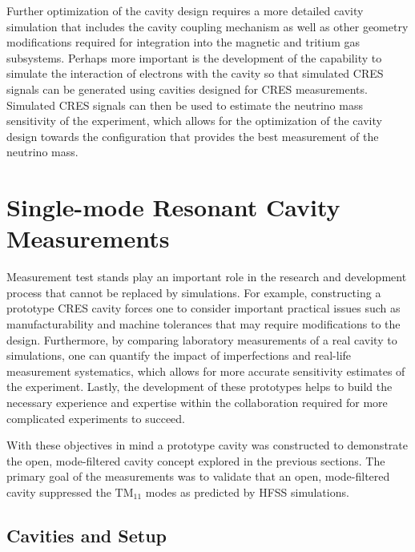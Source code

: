 Further optimization of the cavity design requires a more detailed cavity simulation that includes the cavity coupling mechanism as well as other geometry modifications required for integration into the magnetic and tritium gas subsystems. Perhaps more important is the development of the capability to simulate the interaction of electrons with the cavity so that simulated CRES signals can be generated using cavities designed for CRES measurements. Simulated CRES signals can then be used to estimate the neutrino mass sensitivity of the experiment, which allows for the optimization of the cavity design towards the configuration that provides the best measurement of the neutrino mass. 

\section{Single-mode Resonant Cavity Measurements}
\label{sec:chap6-single-mode-cavity-measurement}

Measurement test stands play an important role in the research and development process that cannot be replaced by simulations. For example, constructing a prototype CRES cavity forces one to consider important practical issues such as manufacturability and machine tolerances that may require modifications to the design. Furthermore, by comparing laboratory measurements of a real cavity to simulations, one can quantify the impact of imperfections and real-life measurement systematics, which allows for more accurate sensitivity estimates of the experiment. Lastly, the development of these prototypes helps to build the necessary experience and expertise within the collaboration required for more complicated experiments to succeed.

With these objectives in mind a prototype cavity was constructed to demonstrate the open, mode-filtered cavity concept explored in the previous sections. The primary goal of the measurements was to validate that an open, mode-filtered cavity suppressed the $\mathrm{TM}_{11}$ modes as predicted by HFSS simulations.

\subsection{Cavities and Setup}

